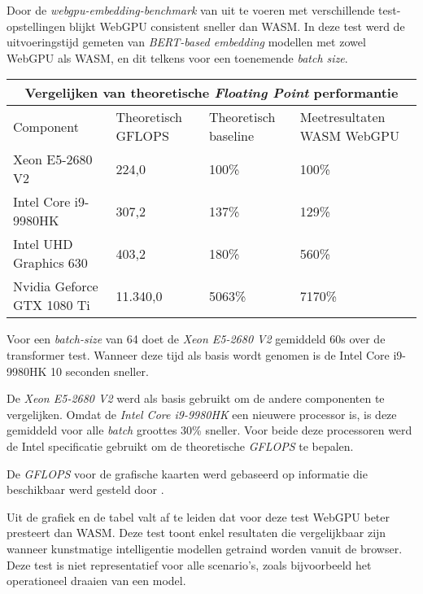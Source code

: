 \bigbreak{}



Door de \textit{webgpu-embedding-benchmark} van \textcite{Lochner2024} uit te voeren met verschillende test-opstellingen blijkt WebGPU consistent sneller dan WASM. In deze test werd de uitvoeringstijd gemeten van \textit{BERT-based embedding} modellen met zowel WebGPU als WASM, en dit telkens voor een toenemende \textit{batch size}.

\break{}

\begin{tabular}{ |p{5cm}|p{3cm}|p{3cm}|p{3cm}|  }
    \hline
    \multicolumn{4}{|c|}{Vergelijken van theoretische \textit{Floating Point} performantie} \\
    \hline
    Component& Theoretisch GFLOPS & Theoretisch baseline & Meetresultaten WASM WebGPU\\
    \hline
        Xeon E5-2680 V2             & 224,0     & 100\%  & 100\%       \\
        Intel Core i9-9980HK        & 307,2     & 137\%  & 129\%    \\
        Intel UHD Graphics 630      & 403,2     & 180\%  & 560\%    \\
        Nvidia Geforce GTX 1080 Ti  & 11.340,0  & 5063\% & 7170\%   \\
    \hline
\end{tabular}

\bigbreak{}

Voor een \textit{batch-size} van 64 doet de \textit{Xeon E5-2680 V2} gemiddeld 60s over de transformer test. Wanneer deze tijd als basis wordt genomen is de Intel Core i9-9980HK 10 seconden sneller.

\bigbreak{}

De \textit{Xeon E5-2680 V2} werd als basis gebruikt om de andere componenten te vergelijken. Omdat de \textit{Intel Core i9-9980HK} een nieuwere processor is, is deze gemiddeld voor alle \textit{batch} groottes 30\% sneller. Voor beide deze processoren werd de Intel specificatie gebruikt om de theoretische \textit{GFLOPS} te bepalen. \autocite{Intel2024, Intel2024a}

\bigbreak{}

De \textit{GFLOPS} voor de grafische kaarten werd gebaseerd op informatie die beschikbaar werd gesteld door \textcite{TechPowerUp2017, TechPowerUp2017a}.

\bigbreak{}

Uit de grafiek en de tabel valt af te leiden dat voor deze test WebGPU beter presteert dan WASM. Deze test toont enkel resultaten die vergelijkbaar zijn wanneer kunstmatige intelligentie modellen getraind worden vanuit de browser. Deze test is niet representatief voor alle scenario's, zoals bijvoorbeeld het operationeel draaien van een model.


